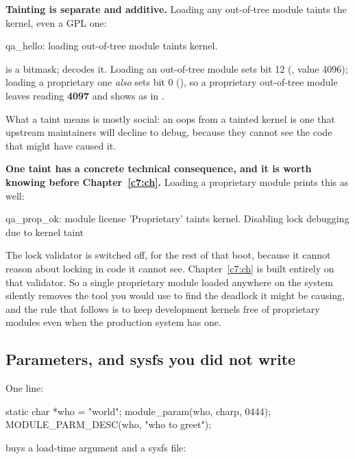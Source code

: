\textbf{Tainting is separate and additive.} Loading any out-of-tree module taints the kernel, even a
GPL one:

\begin{console}
qa_hello: loading out-of-tree module taints kernel.
\end{console}

\noindent {} is a bitmask;
 decodes it. Loading an out-of-tree module sets
bit 12 (, value 4096); loading a proprietary one \emph{also} sets bit 0
(), so a proprietary out-of-tree module leaves
 reading \textbf{4097} and shows as  in
.

What a taint means is mostly social: an oops from a tainted kernel is one that upstream maintainers
will decline to debug, because they cannot see the code that might have caused it.

\textbf{One taint has a concrete technical consequence, and it is worth knowing before
Chapter~\ref{c7:ch}.} Loading a proprietary module prints this as well:

\begin{console}
qa_prop_ok: module license 'Proprietary' taints kernel.
Disabling lock debugging due to kernel taint
\end{console}

\noindent The lock validator is switched off, for the rest of that boot, because it cannot reason
about locking in code it cannot see. Chapter~\ref{c7:ch} is built entirely on that validator. So a
single proprietary module loaded anywhere on the system silently removes the tool you would use to
find the deadlock it might be causing, and the rule that follows is to keep development kernels free
of proprietary modules even when the production system has one.

\subsection{Parameters, and sysfs you did not write}
\label{c4:app:a6}

One line:

\begin{ccode}
static char *who = "world";
module_param(who, charp, 0444);
MODULE_PARM_DESC(who, "who to greet");
\end{ccode}

\noindent buys a load-time argument and a sysfs file:

